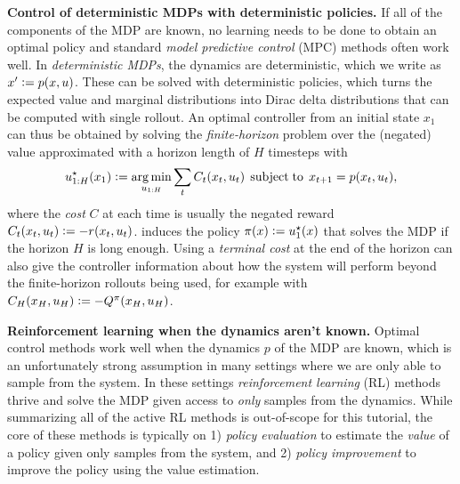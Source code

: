 \documentclass[twoside,11pt]{article}
\begin{document}
\textbf{Control of deterministic MDPs with deterministic policies.}
If all of the components of the MDP are known,
no learning needs to be done to obtain an optimal policy
and standard \emph{model predictive control} (MPC) methods often work well.
In \emph{deterministic MDPs}, the dynamics are deterministic,
which we write as $x'\vcentcolon= p(x, u)$.
These can be solved with deterministic policies,
which turns the expected value and marginal distributions
into Dirac delta distributions that can be computed with single rollout.
An optimal controller from an initial state $x_1$ can thus
be obtained by solving the \emph{finite-horizon} problem over the
(negated) value approximated with a horizon length of
$H$ timesteps with
\begin{equation}
  u^\star_{1:H}(x_1) \vcentcolon= \operatorname*{arg\,min}_{u_{1:H}} \sum_t C_t(x_t, u_t)\; \operatorname*{subject\;to}\; x_{t+1}=p(x_t, u_t),
  \label{eq:mpc}
\end{equation}
where the \emph{cost} $C$ at each time is usually the negated reward
$C_t(x_t, u_t)\vcentcolon= -r(x_t, u_t)$.
 induces the policy $\pi(x)\vcentcolon= u^\star_1(x)$ that
solves the MDP if the horizon $H$ is long enough.
Using a \emph{terminal cost} at the end of the horizon can
also give the controller information about how the system will
perform beyond the finite-horizon rollouts being used,
for example with
$C_H(x_H, u_H)\vcentcolon= -Q^\pi(x_H, u_H)$.

\textbf{Reinforcement learning when the dynamics aren't known.}
Optimal control methods work well when the dynamics $p$
of the MDP are known, which is an unfortunately strong
assumption in many settings where we are only able to
sample from the system.
In these settings \emph{reinforcement learning} (RL)
methods thrive and solve the MDP given access to
\emph{only} samples from the dynamics.
While summarizing all of the active RL methods is out-of-scope
for this tutorial, the core of these methods is typically on
1) \emph{policy evaluation} to estimate the \emph{value}
of a policy given only samples from the system, and
2) \emph{policy improvement} to improve the policy
using the value estimation.
\end{document}
